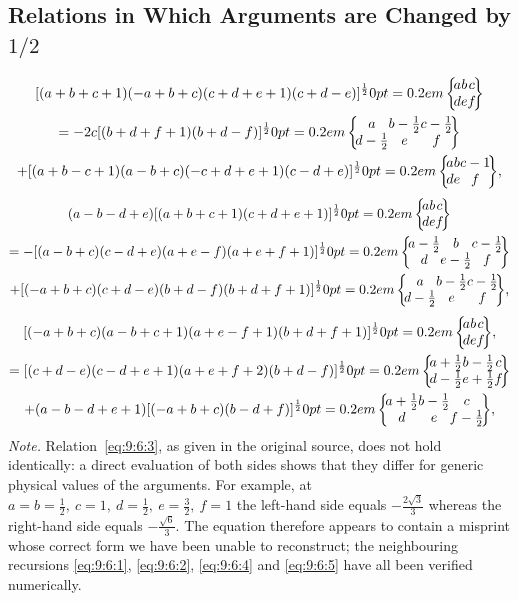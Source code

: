 \subsection{Relations in Which Arguments are Changed by $1 / 2$}\label{sec:9.6.1}
\begin{multline}
{[(a+b+c+1)(-a+b+c)(c+d+e+1)(c+d-e)]^{\frac{1}{2}}\sixj{a}{b}{c}{d}{e}{f}}  \\
=-2 c[(b+d+f+1)(b+d-f)]^{\frac{1}{2}}\sixj{a}{b-\frac{1}{2}}{c-\frac{1}{2}}{d-\frac{1}{2}}{e}{f}  \\
+[(a+b-c+1)(a-b+c)(-c+d+e+1)(c-d+e)]^{\frac{1}{2}}\sixj{a}{b}{c-1}{d}{e}{f},  \label{eq:9:6:1}
\end{multline}
\begin{multline}
(a-b-d+e)[(a+b+c+1)(c+d+e+1)]^{\frac{1}{2}}\sixj{a}{b}{c}{d}{e}{f}  \\
=-[(a-b+c)(c-d+e)(a+e-f)(a+e+f+1)]^{\frac{1}{2}}\sixj{a-\frac{1}{2}}{b}{c-\frac{1}{2}}{d}{e-\frac{1}{2}}{f}  \\
+[(-a+b+c)(c+d-e)(b+d-f)(b+d+f+1)]^{\frac{1}{2}}\sixj{a}{b-\frac{1}{2}}{c-\frac{1}{2}}{d-\frac{1}{2}}{e}{f},  \label{eq:9:6:2}
\end{multline}
\begin{multline}
{[(-a+b+c)(a-b+c+1)(a+e-f+1)(b+d+f+1)]^{\frac{1}{2}}\sixj{a}{b}{c}{d}{e}{f},}  \\
=[(c+d-e)(c-d+e+1)(a+e+f+2)(b+d-f)]^{\frac{1}{2}}\sixj{a+\frac{1}{2}}{b-\frac{1}{2}}{c}{d-\frac{1}{2}}{e+\frac{1}{2}}{f}  \\
+(a-b-d+e+1)[(-a+b+c)(b-d+f)]^{\frac{1}{2}}\sixj{a+\frac{1}{2}}{b-\frac{1}{2}}{c}{d}{e}{f-\frac{1}{2}}, \label{eq:9:6:3}
\end{multline}
\emph{Note.} Relation~\eqref{eq:9:6:3}, as given in the original source, does not hold identically: a direct evaluation of both sides shows that they differ for generic physical values of the arguments. For example, at $a=b=\frac{1}{2},\ c=1,\ d=\frac{1}{2},\ e=\frac{3}{2},\ f=1$ the left-hand side equals $-\frac{2\sqrt{3}}{3}$ whereas the right-hand side equals $-\frac{\sqrt{6}}{3}$. The equation therefore appears to contain a misprint whose correct form we have been unable to reconstruct; the neighbouring recursions \eqref{eq:9:6:1}, \eqref{eq:9:6:2}, \eqref{eq:9:6:4} and \eqref{eq:9:6:5} have all been verified numerically.
